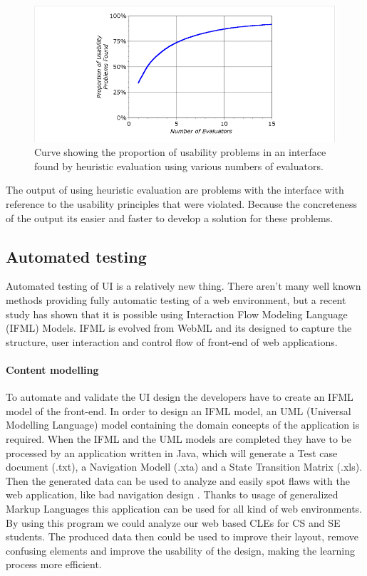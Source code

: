 \documentclass[10pt,english,a4paper]{article}
\begin{document}
\begin{figure}[h]
    \includegraphics[width=1\textwidth]{images/heuristic-results.png}
    \caption{Curve showing the proportion of usability problems in an interface
     found by heuristic evaluation using various numbers of evaluators\cite{a2020_heuristic}.}
     \label{fig:increase}
\end{figure}
The output of using heuristic evaluation are problems with the interface with reference to the usability
principles that were violated\cite{a2020_heuristic}. Because the concreteness of the output 
its easier and faster to develop a solution for these problems. 



\subsection{Automated testing}
Automated testing of UI is a relatively new thing\cite{automated_testing_ifml}. There aren't many well known methods
providing fully automatic testing of a web environment, but a recent study has shown that
it is possible using Interaction Flow Modeling Language (IFML) Models\cite{automated_testing_ifml}.
IFML is evolved from WebML and its designed to capture the structure, user interaction and control
flow of front-end of web applications\cite{automated_testing_ifml}.


\paragraph{Content modelling}
To automate and validate the UI design the developers have to create an IFML model
of the front-end. In order to design an IFML model, an UML (Universal Modelling Language) model 
containing the domain concepts of the application is required\cite{automated_testing_ifml}. 
When the IFML and the UML models are completed they have to be processed by an application written 
in Java, which will generate a Test case document (.txt), a Navigation Modell (.xta) and a State Transition 
Matrix (.xls). Then the generated data can be used to analyze and easily spot flaws with the web application, like bad navigation design
\cite{automated_testing_ifml}. 
Thanks to usage of generalized Markup Languages this application can be used for all kind of web environments. 
By using this program we could analyze our web based CLEs for CS and SE students. 
The produced data then could be used to improve their layout, remove confusing elements and improve the usability of the design,
making the learning process more efficient.
\end{document}
